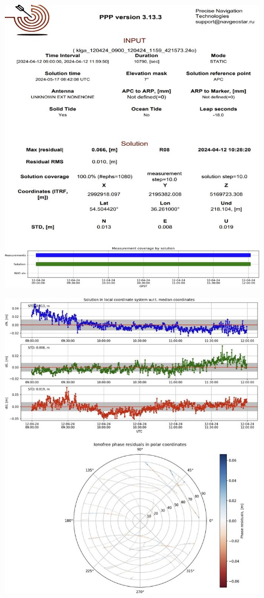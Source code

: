 \begin{figure}[ht]
	\centering
	\includegraphics[width=\linewidth]{images/picC01}
\end{figure}

\begin{figure}[hp]
	\centering
	\includegraphics[width=\linewidth]{images/picC02}
\end{figure}

